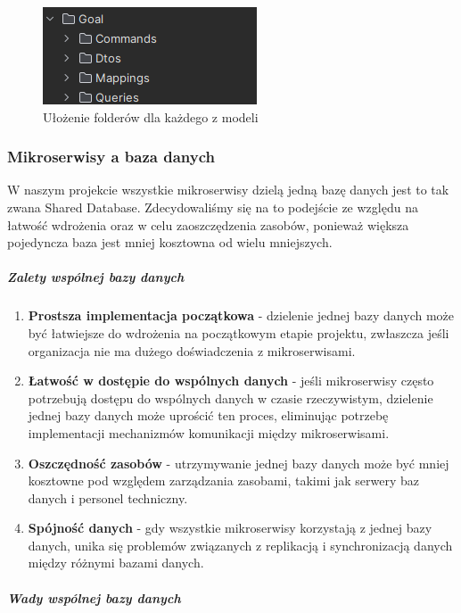 \begin{figure}[H]
    \centering
    \includegraphics[width=0.5\linewidth]{Obrazy/strukturaFolderowBE.png}
    \caption{Ułożenie folderów dla każdego z modeli}
    \label{fig:enter-label}
\end{figure}

\subsubsection{Mikroserwisy a baza danych}
W naszym projekcie wszystkie mikroserwisy dzielą jedną bazę danych jest to tak zwana Shared Database. Zdecydowaliśmy się na to podejście ze względu na łatwość wdrożenia oraz w celu zaoszczędzenia zasobów, ponieważ większa pojedyncza baza jest mniej kosztowna od wielu mniejszych.

\subparagraph{Zalety wspólnej bazy danych}

\begin{enumerate}
\item {\bf Prostsza implementacja początkowa} - dzielenie jednej bazy danych może być łatwiejsze do wdrożenia na początkowym etapie projektu, zwłaszcza jeśli organizacja nie ma dużego doświadczenia z mikroserwisami.
\item {\bf Łatwość w dostępie do wspólnych danych} - jeśli mikroserwisy często potrzebują dostępu do wspólnych danych w czasie rzeczywistym, dzielenie jednej bazy danych może uprościć ten proces, eliminując potrzebę implementacji mechanizmów komunikacji między mikroserwisami.
\item {\bf Oszczędność zasobów} - utrzymywanie jednej bazy danych może być mniej kosztowne pod względem zarządzania zasobami, takimi jak serwery baz danych i personel techniczny.
\item {\bf Spójność danych} - gdy wszystkie mikroserwisy korzystają z jednej bazy danych, unika się problemów związanych z replikacją i synchronizacją danych między różnymi bazami danych.
\end{enumerate}

\subparagraph{Wady wspólnej bazy danych}

